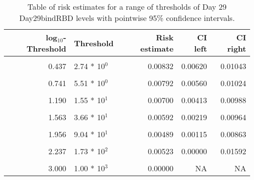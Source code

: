 \documentclass[]{article}
\begin{document}
\begin{table}[!h]

\caption{\label{tab:unnamed-chunk-11}Table of risk estimates for a range of thresholds of Day 29 Day29bindRBD levels with pointwise 95\% confidence intervals.}
\centering
\begin{tabular}[t]{rlrrr}
\toprule
log$_{10}$-Threshold & Threshold & Risk estimate & CI left & CI right\\
\midrule
\cellcolor{gray!6}{-0.099} & \cellcolor{gray!6}{7.96 * 10$^{1}$} & \cellcolor{gray!6}{0.00856} & \cellcolor{gray!6}{0.00655} & \cellcolor{gray!6}{0.01057}\\
0.437 & 2.74 * 10$^{0}$ & 0.00832 & 0.00620 & 0.01043\\
\cellcolor{gray!6}{0.585} & \cellcolor{gray!6}{3.85 * 10$^{0}$} & \cellcolor{gray!6}{0.00837} & \cellcolor{gray!6}{0.00612} & \cellcolor{gray!6}{0.01062}\\
0.741 & 5.51 * 10$^{0}$ & 0.00792 & 0.00560 & 0.01024\\
\cellcolor{gray!6}{1.000} & \cellcolor{gray!6}{1.00 * 10$^{1}$} & \cellcolor{gray!6}{0.00756} & \cellcolor{gray!6}{0.00515} & \cellcolor{gray!6}{0.00998}\\
1.190 & 1.55 * 10$^{1}$ & 0.00700 & 0.00413 & 0.00988\\
\cellcolor{gray!6}{1.371} & \cellcolor{gray!6}{2.35 * 10$^{1}$} & \cellcolor{gray!6}{0.00636} & \cellcolor{gray!6}{0.00315} & \cellcolor{gray!6}{0.00956}\\
1.563 & 3.66 * 10$^{1}$ & 0.00592 & 0.00219 & 0.00964\\
\cellcolor{gray!6}{1.852} & \cellcolor{gray!6}{7.11 * 10$^{1}$} & \cellcolor{gray!6}{0.00606} & \cellcolor{gray!6}{0.00177} & \cellcolor{gray!6}{0.01035}\\
1.956 & 9.04 * 10$^{1}$ & 0.00489 & 0.00115 & 0.00863\\
\cellcolor{gray!6}{2.083} & \cellcolor{gray!6}{1.21 * 10$^{2}$} & \cellcolor{gray!6}{0.00523} & \cellcolor{gray!6}{0.00000} & \cellcolor{gray!6}{0.01592}\\
2.237 & 1.73 * 10$^{2}$ & 0.00523 & 0.00000 & 0.01592\\
\cellcolor{gray!6}{2.699} & \cellcolor{gray!6}{5.00 * 10$^{2}$} & \cellcolor{gray!6}{0.00000} & \cellcolor{gray!6}{NA} & \cellcolor{gray!6}{NA}\\
3.000 & 1.00 * 10$^{3}$ & 0.00000 & NA & NA\\
\bottomrule
\end{tabular}
\end{table}
\end{document}
